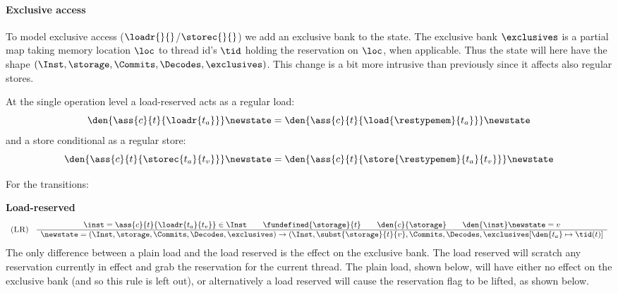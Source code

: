 \paragraph{Exclusive access}
To model exclusive access ($\loadr{}{}$/$\storec{}{}$) we add an exclusive bank to the state. The exclusive bank $\exclusives$ is a partial map taking memory location $\loc$ to thread id's $\tid$ holding the reservation on $\loc$, when applicable. Thus the state will here have the shape $(\Inst,\storage,\Commits,\Decodes,\exclusives)$. This change is a bit more intrusive than previously since it affects also regular stores. 

At the single operation level a load-reserved acts as a regular load:
\[
\den{\ass{c}{t}{\loadr{t_a}}}\newstate = \den{\ass{c}{t}{\load{\restypemem}{t_a}}}\newstate
\]
and a store conditional as a regular store:
\[
\den{\ass{c}{t}{\storec{t_a}{t_v}}}\newstate = \den{\ass{c}{t}{\store{\restypemem}{t_a}{t_v}}}\newstate
\]

For the transitions:

\noindent \textbf{Load-reserved} 
  \[
    \begin{array}{cc}
(\mbox{\sc LR})
&
\begin{array}{c}
  \inst =  \ass{c}{t}{\loadr{t_a}{t_v}}  \in \Inst \qquad \fundefined{\storage}{t} \qquad
\den{c}{\storage} \qquad \den{\inst}\newstate = v
\\ \hline
\newstate = (\Inst, \storage, \Commits, \Decodes,\exclusives) \rightarrow (\Inst,\subst{\storage}{t}{v}, \Commits, \Decodes,\exclusives[\den{t_a}\mapsto\tid(t)]
\end{array}\\
\end{array}
\]
%
The only difference between a plain load and the load reserved is the effect on the exclusive bank. The load reserved will scratch any reservation currently in effect and grab the reservation for the current thread. The plain load, shown below, will have either no effect on the exclusive bank (and so this rule is left out), or alternatively a load reserved will cause the reservation flag to be lifted, as shown below.

